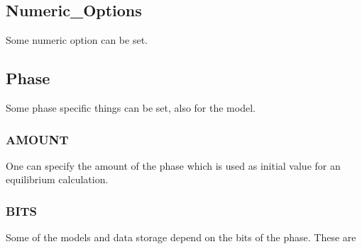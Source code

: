 \documentclass[12pt]{article}
\begin{document}
\subsection{Numeric\_Options}

Some numeric option can be set.

\subsection{Phase}

Some phase specific things can be set, also for the model.

\subsubsection{AMOUNT}

One can specify the amount of the phase which is used as initial value
for an equilibrium calculation.

\subsubsection{BITS}

Some of the models and data storage depend on the bits of the phase.
These are
\end{document}
